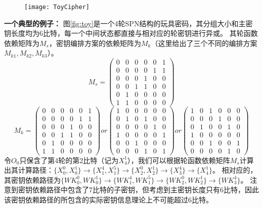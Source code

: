 \begin{figure}[htbp]
\centering
    \texttt{[image: ToyCipher]}
\end{figure}
\textbf{一个典型的例子：}
图\ref{fig:toy}是一个4轮SPN结构的玩具密码，其分组大小和主密钥长度均为6比特，每一个中间状态都直接与相对应的轮密钥进行异或。
其轮函数依赖矩阵为$M_s$，密钥编排方案的依赖矩阵为$M_k$（这里给出了三个不同的编排方案$M_{k1},M_{k2},M_{k3}$）。
$$M_s=\left(
    \begin{array}{cccccc}
        0&0&0&0&0&1\\
        0&0&0&0&1&1\\
        0&0&0&1&0&0\\
        0&0&1&1&0&0\\
        0&1&0&0&0&0\\
        1&1&0&0&0&0
    \end{array}
\right)$$
$$M_k=\left(
    \begin{array}{cccccc}
        0&0&0&0&0&1\\
        0&0&0&0&1&1\\
        0&0&0&1&0&0\\
        0&0&1&1&0&0\\
        0&1&0&0&0&0\\
        1&1&0&0&0&0
    \end{array}
\right)
or\left(
    \begin{array}{cccccc}
        1&0&0&0&0&0\\
        0&1&0&1&0&0\\
        0&0&0&0&1&0\\
        1&0&0&0&0&1\\
        0&0&1&0&0&0\\
        0&0&0&1&0&1
    \end{array}
\right)
or\left(
    \begin{array}{cccccc}
        1&0&1&0&0&0\\
        0&0&0&1&0&0\\
        0&1&0&0&1&0\\
        1&0&0&0&0&0\\
        0&0&1&0&0&1\\
        0&0&0&0&1&0
    \end{array}
\right)$$
令$O_0$只保含了第4轮的第2比特（记为$X_4^1$），我们可以根据轮函数依赖矩阵$M_s$计算出其计算路径：$\{X_0^0,X_0^1\}\rightarrow \{X_1^4,X_1^5\}\rightarrow \{X_2^0,X_2^1\}\rightarrow \{X_3^4\}\rightarrow \{X_4^1\}$。
相对应的，其密钥依赖路径为$\{WK_0^0,WK_0^1\}\rightarrow \{WK_1^4,WK_1^5\}\rightarrow \{WK_2^0,WK_2^1\}\rightarrow \{WK_3^4\}$。
注意到密钥依赖路径中包含了7比特的子密钥，但考虑到主密钥长度只有6比特，因此该密钥依赖路径的所包含的实际密钥信息理论上不可能超过6比特。

